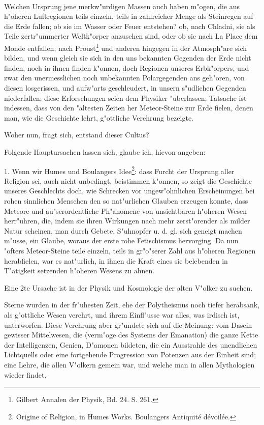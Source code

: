 \documentclass[a4paper, 11pt, oneside, polutonikogreek, german]{article}
\begin{document}
\paragraph{}
Welchen Ursprung jene merkw"urdigen Massen auch haben m"ogen, die aus h"oheren Luftregionen teils einzeln, teils in zahlreicher Menge als Steinregen auf die Erde fallen; ob sie im Wasser oder Feuer entstehen? ob, nach Chladni, sie als Teile zertr"ummerter Weltk"orper anzusehen sind, oder ob sie nach La Place dem Monde entfallen; nach Proust\footnote{Gilbert Annalen der Physik, Bd. 24. S. 261.} und anderen hingegen in der Atmosph"are sich bilden, und wenn gleich sie sich in den uns bekannten Gegenden der Erde nicht finden, noch in ihnen finden k"onnen, doch Regionen unseres Erbk"orpers, und zwar den unermesslichen noch unbekannten Polargegenden ans geh"oren, von diesen losgerissen, und aufw"arts geschleudert, in unsern s"udlichen Gegenden niederfallen; diese Erforschungen seien dem Physiker "uberlassen; Tatsache ist indessen, dass von den "altesten Zeiten her Meteor-Steine zur Erde fielen, denen man, wie die Geschichte lehrt, g"ottliche Verehrung bezeigte.

Woher nun, fragt sich, entstand dieser Cultus?

Folgende Hauptursachen lassen sich, glaube ich, hievon angeben:

1. Wenn wir Humes und Boulangers Idee\footnote{Origine of Religion, in Humes Works. Boulangers Antiquité dévoilée.}: dass Furcht der Ursprung aller Religion sei, auch nicht unbedingt, beistimmen k"onnen, so zeigt die Geschichte unseres Geschlechts doch, wie Schrecken vor ungew"ohnlichen Erscheinungen bei rohen sinnlichen Menschen den so nat"urlichen Glauben erzeugen konnte, dass Meteore und au"serordentliche Ph"anomene von unsichtbaren h"oheren Wesen herr"uhren, die, indem sie ihren Wirkungen nach mehr zerst"orender als milder Natur scheinen, man durch Gebete, S"uhnopfer u. d. gl. sich geneigt machen m"usse, ein Glaube, woraus der erste rohe Fetischismus hervorging. Da nun "ofters Meteor-Steine teile einzeln, teils in gr"o"serer Zahl aus h"oheren Regionen herabfielen, war es nat"urlich, in ihnen die Kraft eines sie belebenden in T"atigkeit setzenden h"oheren Wesens zu ahnen.

Eine 2te Ursache ist in der Physik und Kosmologie der alten V"olker zu suchen.

Sterne wurden in der fr"uhesten Zeit, ehe der Polytheismus noch tiefer herabsank, als g"ottliche Wesen verehrt, und ihrem Einfl"usse war alles, was irdisch ist, unterworfen. Diese Verehrung aber gr"undete sich auf die Meinung: vom Dasein gewisser Mittelwesen, die (verm"oge des Systems der Emanation) die ganze Kette der Intelligenzen, Genien, D"amonen bildeten, die ein Ausstrahle des unendlichen Lichtquells oder eine fortgehende Progression von Potenzen aus der Einheit sind; eine Lehre, die allen V"olkern gemein war, und welche man in allen Mythologien wieder findet.
\end{document}

